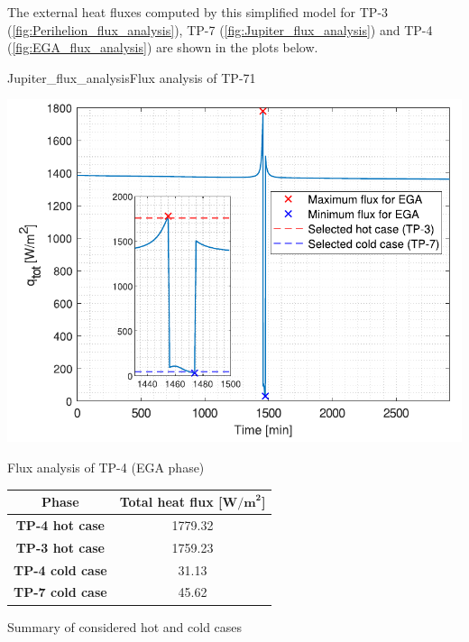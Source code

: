 The external heat fluxes computed by this simplified model for TP-3 (\autoref{fig:Perihelion_flux_analysis}), TP-7 (\autoref{fig:Jupiter_flux_analysis}) and TP-4 (\autoref{fig:EGA_flux_analysis}) are shown in the plots below.

    {Jupiter_flux_analysis}{Flux analysis of TP-7}{1}
\vspace*{-2mm}
\begin{minipage}{0.5\linewidth}
    \centering
    \captionsetup{type=figure}
    \includegraphics[width=\linewidth]{Images/EGA_flux_analysis.pdf}
    \caption{Flux analysis of TP-4 (EGA phase)}
    \label{fig:EGA_flux_analysis}
\end{minipage}\hfill
\begin{minipage}{0.5\linewidth}
    \centering
    \captionsetup{type=table}
    \renewcommand{\arraystretch}{1.4}
    \begin{tabular}{|c|c|}
        \hline
        \textbf{Phase} &
        \textbf{Total heat flux [$\boldsymbol{\textbf{W/m}^2}$]} \\
        \hline
        \hline
        \textbf{TP-4 hot case}      & 1779.32   \\
        \hline
        \textbf{TP-3 hot case}      & 1759.23   \\
        \hline
        \hline
        \textbf{TP-4 cold case}     & 31.13     \\
        \hline
        \textbf{TP-7 cold case}     & 45.62     \\
        \hline
    \end{tabular}
    \caption{Summary of considered hot and cold cases}
    \label{table:cases}
\end{minipage}

